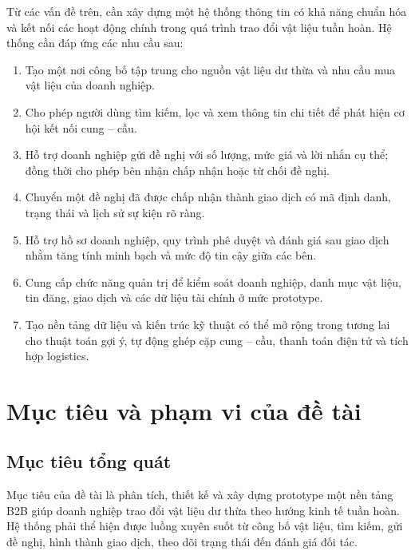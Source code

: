 \documentclass[12pt,a4paper,oneside]{report}
\begin{document}
Từ các vấn đề trên, cần xây dựng một hệ thống thông tin có khả năng chuẩn hóa và
kết nối các hoạt động chính trong quá trình trao đổi vật liệu tuần hoàn. Hệ thống
cần đáp ứng các nhu cầu sau:

\begin{enumerate}[leftmargin=1.1cm]
  \item Tạo một nơi công bố tập trung cho nguồn vật liệu dư thừa và nhu cầu mua
  vật liệu của doanh nghiệp.

  \item Cho phép người dùng tìm kiếm, lọc và xem thông tin chi tiết để phát hiện
  cơ hội kết nối cung -- cầu.

  \item Hỗ trợ doanh nghiệp gửi đề nghị với số lượng, mức giá và lời nhắn cụ thể;
  đồng thời cho phép bên nhận chấp nhận hoặc từ chối đề nghị.

  \item Chuyển một đề nghị đã được chấp nhận thành giao dịch có mã định danh,
  trạng thái và lịch sử sự kiện rõ ràng.

  \item Hỗ trợ hồ sơ doanh nghiệp, quy trình phê duyệt và đánh giá sau giao dịch
  nhằm tăng tính minh bạch và mức độ tin cậy giữa các bên.

  \item Cung cấp chức năng quản trị để kiểm soát doanh nghiệp, danh mục vật liệu,
  tin đăng, giao dịch và các dữ liệu tài chính ở mức prototype.

  \item Tạo nền tảng dữ liệu và kiến trúc kỹ thuật có thể mở rộng trong tương lai
  cho thuật toán gợi ý, tự động ghép cặp cung -- cầu, thanh toán điện tử và tích
  hợp logistics.
\end{enumerate}

\section{Mục tiêu và phạm vi của đề tài}
\label{sec:muc-tieu-pham-vi}

\subsection{Mục tiêu tổng quát}

Mục tiêu của đề tài là phân tích, thiết kế và xây dựng prototype một nền tảng B2B
giúp doanh nghiệp trao đổi vật liệu dư thừa theo hướng kinh tế tuần hoàn. Hệ thống
phải thể hiện được luồng xuyên suốt từ công bố vật liệu, tìm kiếm, gửi đề nghị,
hình thành giao dịch, theo dõi trạng thái đến đánh giá đối tác.
\end{document}

